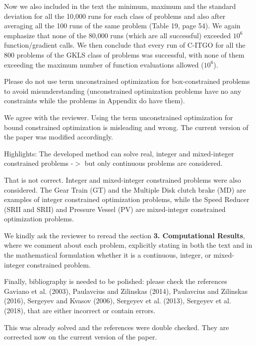 \begin{revAns}
Now we also included in the text the minimum, maximum and the standard deviation for all the 10,000 runs for each class of problems and also after averaging all the 100 runs of the same problem (Table 19, page 54). We again emphasize that none of the 80,000 runs (which are all successful) exceeded $10^6$ function/gradient calls. We then conclude that every run of C-ITGO for all the 800 problems of the GKLS class of problems was successful, with none of them exceeding the maximum number of function evaluations allowed ($10^6$).


\end{revAns}


\begin{revAns}{Please do not use term unconstrained optimization for box-constrained problems to avoid misunderstanding (unconstrained optimization problems have no any constraints while the problems in Appendix do have them).}

We agree with the reviewer. Using the term unconstrained optimization for bound constrained optimization is misleading and wrong. The current version of the paper was modified accordingly. %

\end{revAns}


\begin{revAns}{Highlights: The developed method can solve real, integer and mixed-integer constrained problems -$>$ but only continuous problems are considered.}

That is not correct. Integer and mixed-integer constrained problems were also considered. The Gear Train (GT) and the Multiple Disk clutch brake (MD) are examples of integer constrained optimization problems, while the Speed Reducer (SRII and SRII) and Pressure Vessel (PV) are mixed-integer constrained optimization problems.

We kindly ask the reviewer to reread the section \textbf{3. Computational Results}, where we comment about each problem, explicitly stating in both the text and in the mathematical formulation whether it is a continuous, integer, or mixed-integer constrained problem.

\end{revAns}



\begin{revAns}{Finally, bibliography is needed to be polished: please check the references Gaviano et al. (2003), Paulavcius and Zilinskas (2014), Paulavcius and Zilinskas (2016), Sergeyev and Kvasov (2006), Sergeyev et al. (2013), Sergeyev et al. (2018), that are either incorrect or contain errors.}

This was already solved and the references were double checked. They are corrected now on the current version of the paper.

\end{revAns}
